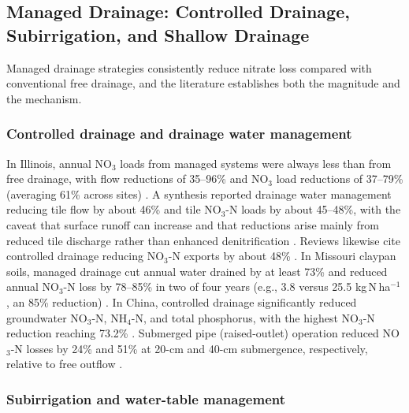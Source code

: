 \subsection{Managed Drainage: Controlled Drainage, Subirrigation, and Shallow Drainage}

Managed drainage strategies consistently reduce nitrate loss compared with conventional free drainage, and the literature establishes both the magnitude and the mechanism.

\subsubsection{Controlled drainage and drainage water management}

In Illinois, annual NO$_3$ loads from managed systems were always less than from free drainage, with flow reductions of 35--96\% and NO$_3$ load reductions of 37--79\% (averaging 61\% across sites) \parencite{Cooke2012}. A synthesis reported drainage water management reducing tile flow by about 46\% and tile NO$_3$-N loads by about 45--48\%, with the caveat that surface runoff can increase and that reductions arise mainly from reduced tile discharge rather than enhanced denitrification \parencite{Ross2016}. Reviews likewise cite controlled drainage reducing NO$_3$-N exports by about 48\% \parencite{Ward2018}. In Missouri claypan soils, managed drainage cut annual water drained by at least 73\% and reduced annual NO$_3$-N loss by 78--85\% in two of four years (e.g., 3.8 versus 25.5 kg\,N\,ha$^{-1}$, an 85\% reduction) \parencite{Nash2015d}. In China, controlled drainage significantly reduced groundwater NO$_3$-N, NH$_4$-N, and total phosphorus, with the highest NO$_3$-N reduction reaching 73.2\% \parencite{Cui2016}. Submerged pipe (raised-outlet) operation reduced NO$_3$-N losses by 24\% and 51\% at 20-cm and 40-cm submergence, respectively, relative to free outflow \parencite{Tao2021}.

\subsubsection{Subirrigation and water-table management}

